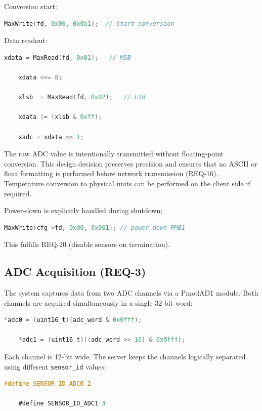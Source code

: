 Conversion start:

\begin{lstlisting}[language=C]
	MaxWrite(fd, 0x00, 0x0a1);  // start conversion
\end{lstlisting}

Data readout:

\begin{lstlisting}[language=C]
	xdata = MaxRead(fd, 0x01);   // MSB
	
	xdata <<= 8;
	
	xlsb  = MaxRead(fd, 0x02);   // LSB
	
	xdata |= (xlsb & 0xff);
	
	xadc = xdata >> 1;
\end{lstlisting}

The raw ADC value is intentionally transmitted without floating-point conversion. This design decision preserves precision and ensures that no ASCII or float formatting is performed before network transmission (REQ-16). Temperature conversion to physical units can be performed on the client side if required.

Power-down is explicitly handled during shutdown:

\begin{lstlisting}[language=C]
	MaxWrite(cfg->fd, 0x00, 0x001); // power down PMB1
\end{lstlisting}

This fulfills REQ-20 (disable sensors on termination).

\subsection{ADC Acquisition (REQ-3)}

The system captures data from two ADC channels via a PmodAD1 module. Both channels are acquired simultaneously in a single 32-bit word:

\begin{lstlisting}[language=C]
	*adc0 = (uint16_t)(adc_word & 0x0fff);
	
	*adc1 = (uint16_t)((adc_word >> 16) & 0x0fff);
\end{lstlisting}

Each channel is 12-bit wide. The server keeps the channels logically separated using different \texttt{sensor\_id} values:

\begin{lstlisting}[language=C]
	#define SENSOR_ID_ADC0 2
	
	#define SENSOR_ID_ADC1 3
\end{lstlisting}


